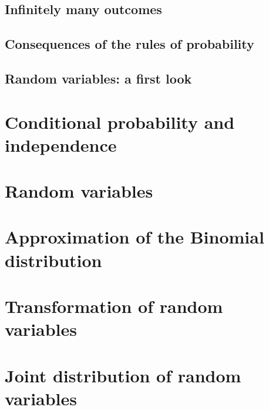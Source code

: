   \subsection{Infinitely many outcomes}
  \label{subsec:1.3}

  \subsection{Consequences of the rules of probability}
  \label{subsec:1.4}

  \subsection{Random variables: a first look}
  \label{subsec:1.5}



\section{Conditional probability and independence}
\label{sec:cond-prob-indep}


\section{Random variables}
\label{sec:random-variables}


\section{Approximation of the Binomial distribution}
\label{sec:appr-binom-distr}


\section{Transformation of random variables}
\label{sec:transf-rand-vari}


\section{Joint distribution of random variables}
\label{sec:joint-distr-rand}

